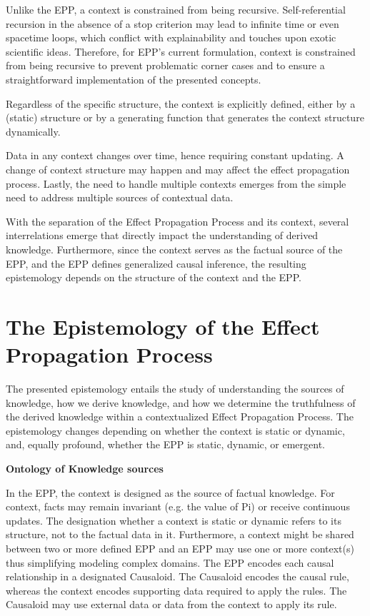 \documentclass{article}
\begin{document}
Unlike the EPP, a context is constrained from being recursive. Self-referential recursion in the absence of a stop criterion may lead to infinite time or even spacetime loops, which conflict with explainability and touches upon exotic scientific ideas. Therefore, for EPP's current formulation, context is constrained from being recursive to prevent problematic corner cases and to ensure a straightforward implementation of the presented concepts.

Regardless of the specific structure, the context is explicitly defined, either by a (static) structure or by a generating function that generates the context structure dynamically.

Data in any context changes over time, hence requiring constant updating. A change of context structure may happen and may affect the effect propagation process. Lastly, the need to handle multiple contexts emerges from the simple need to address multiple sources of contextual data.

With the separation of the Effect Propagation Process and its context, several interrelations emerge that directly impact the understanding of derived knowledge. Furthermore, since the context serves as the factual source of the EPP, and the EPP defines generalized causal inference, the resulting epistemology depends on the structure of the context and the EPP.


\section{The Epistemology of the Effect Propagation Process}
\label{sec:Epistemology}

The presented epistemology entails the study of understanding the sources of knowledge, how we derive knowledge, and how we determine the truthfulness of the derived knowledge within a contextualized Effect Propagation Process. The epistemology changes depending on whether the context is static or dynamic, and, equally profound, whether the EPP is static, dynamic, or emergent.

\textbf{Ontology of Knowledge sources}

In the EPP, the context is designed as the source of factual knowledge. For context, facts may remain invariant (e.g. the value of Pi) or receive continuous updates. The designation whether a context is static or dynamic refers to its structure, not to the factual data in it. Furthermore, a context might be shared between two or more defined EPP and an EPP may use one or more context(s) thus simplifying modeling complex domains.
The EPP encodes each causal relationship in a designated Causaloid. The Causaloid encodes the causal rule, whereas the context encodes supporting data required to apply the rules. The Causaloid may use external data or data from the context to apply its rule.
\end{document}
